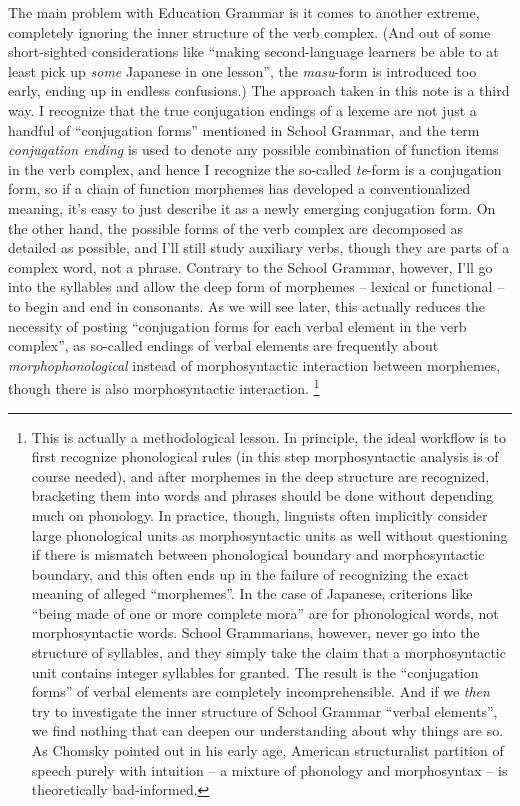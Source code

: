 \documentclass[UTF8, a4paper, oneside, scheme=plain]{ctexart}
\newcommand{\corpus}[1]{\emph{#1}}
\begin{document}
The main problem with Education Grammar is it comes to another extreme,
completely ignoring the inner structure of the verb complex.
(And out of some short-sighted considerations like 
``making second-language learners be able to at least pick up \emph{some} Japanese in one lesson'',
the \corpus{masu}-form is introduced too early,
ending up in endless confusions.)
The approach taken in this note is a third way.
I recognize that the true conjugation endings of a lexeme 
are not just a handful of ``conjugation forms'' mentioned in School Grammar,
and the term \corpus{conjugation ending} is used to denote 
any possible combination of function items in the verb complex,
and hence I recognize the so-called \corpus{te}-form is a conjugation form,
so if a chain of function morphemes has developed a conventionalized meaning,
it's easy to just describe it as a newly emerging conjugation form.
On the other hand,
the possible forms of the verb complex are decomposed as detailed as possible,
and I'll still study auxiliary verbs,
though they are parts of a complex word, not a phrase.
Contrary to the School Grammar, however,
I'll go into the syllables and allow the deep form of morphemes -- lexical or functional --
to begin and end in consonants.
As we will see later,
this actually reduces the necessity of posting 
``conjugation forms for each verbal element in the verb complex'',
as so-called endings of verbal elements 
are frequently about \emph{morphophonological} instead of morphosyntactic interaction between morphemes,
though there is also morphosyntactic interaction.%
\footnote{
    This is actually a methodological lesson.
    In principle, the ideal workflow is to first recognize phonological rules
    (in this step morphosyntactic analysis is of course needed),
    and after morphemes in the deep structure are recognized,
    bracketing them into words and phrases should be done
    without depending much on phonology.
    In practice, though, linguists often implicitly 
    consider large phonological units as morphosyntactic units as well 
    without questioning if there is mismatch between phonological boundary and morphosyntactic boundary,
    and this often ends up in the failure of recognizing the exact meaning of alleged ``morphemes''.
    In the case of Japanese,
    criterions like ``being made of one or more complete mora''
    are for phonological words, not morphosyntactic words.
    School Grammarians, however, never go into the structure of syllables,
    and they simply take the claim that a morphosyntactic unit contains integer syllables for granted.
    The result is the ``conjugation forms'' of verbal elements are completely incomprehensible.
    And if we \emph{then} try to investigate the inner structure of School Grammar ``verbal elements'',
    we find nothing that can deepen our understanding about why things are so.
    As Chomsky pointed out in his early age,
    American structuralist partition of speech purely with intuition 
    -- a mixture of phonology and morphosyntax --
    is theoretically bad-informed.
}
\end{document}
